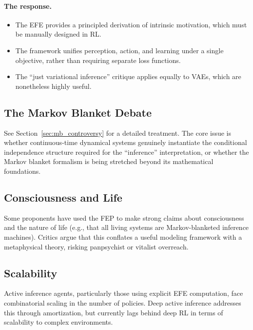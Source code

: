 \documentclass[11pt,a4paper]{article}
\theoremstyle{definition}
\begin{document}
\paragraph{The response.}
\begin{itemize}[leftmargin=2em]
  \item The EFE provides a principled derivation of intrinsic motivation,
    which must be manually designed in RL.
  \item The framework unifies perception, action, and learning under a single
    objective, rather than requiring separate loss functions.
  \item The ``just variational inference'' critique applies equally to VAEs,
    which are nonetheless highly useful.
\end{itemize}

\subsection{The Markov Blanket Debate}

See Section~\ref{sec:mb_controversy} for a detailed treatment.  The core issue
is whether continuous-time dynamical systems genuinely instantiate the
conditional independence structure required for the ``inference'' interpretation,
or whether the Markov blanket formalism is being stretched beyond its
mathematical foundations.

\subsection{Consciousness and Life}

Some proponents have used the FEP to make strong claims about consciousness
and the nature of life (e.g., that all living systems are Markov-blanketed
inference machines).  Critics argue that this conflates a useful modeling
framework with a metaphysical theory, risking panpsychist or vitalist
overreach.

\subsection{Scalability}

Active inference agents, particularly those using explicit EFE computation,
face combinatorial scaling in the number of policies.  Deep active inference
addresses this through amortization, but currently lags behind deep RL in
terms of scalability to complex environments.


\end{document}

